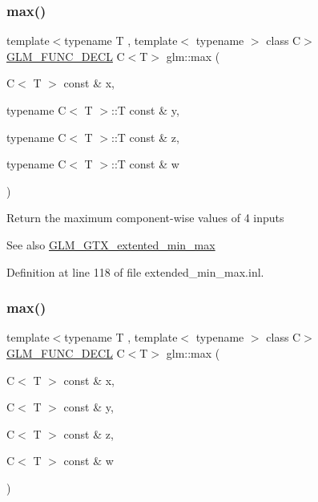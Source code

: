 \subsubsection{\texorpdfstring{max()}{max()}\hspace{0.1cm}{\footnotesize\ttfamily [5/6]}}
{\footnotesize\ttfamily template$<$typename T , template$<$ typename $>$ class C$>$ \\
\mbox{\hyperlink{setup_8hpp_ab2d052de21a70539923e9bcbf6e83a51}{G\+L\+M\+\_\+\+F\+U\+N\+C\+\_\+\+D\+E\+CL}} C$<$T$>$ glm\+::max (\begin{DoxyParamCaption}\item[{C$<$ T $>$ const \&}]{x,  }\item[{typename C$<$ T $>$\+::T const \&}]{y,  }\item[{typename C$<$ T $>$\+::T const \&}]{z,  }\item[{typename C$<$ T $>$\+::T const \&}]{w }\end{DoxyParamCaption})}

Return the maximum component-\/wise values of 4 inputs \begin{DoxySeeAlso}{See also}
\mbox{\hyperlink{group__gtx__extented__min__max}{G\+L\+M\+\_\+\+G\+T\+X\+\_\+extented\+\_\+min\+\_\+max}} 
\end{DoxySeeAlso}


Definition at line 118 of file extended\+\_\+min\+\_\+max.\+inl.

\mbox{\label{group__gtx__extented__min__max_gaacffbc466c2d08c140b181e7fd8a4858}} 
\subsubsection{\texorpdfstring{max()}{max()}\hspace{0.1cm}{\footnotesize\ttfamily [6/6]}}
{\footnotesize\ttfamily template$<$typename T , template$<$ typename $>$ class C$>$ \\
\mbox{\hyperlink{setup_8hpp_ab2d052de21a70539923e9bcbf6e83a51}{G\+L\+M\+\_\+\+F\+U\+N\+C\+\_\+\+D\+E\+CL}} C$<$T$>$ glm\+::max (\begin{DoxyParamCaption}\item[{C$<$ T $>$ const \&}]{x,  }\item[{C$<$ T $>$ const \&}]{y,  }\item[{C$<$ T $>$ const \&}]{z,  }\item[{C$<$ T $>$ const \&}]{w }\end{DoxyParamCaption})}

